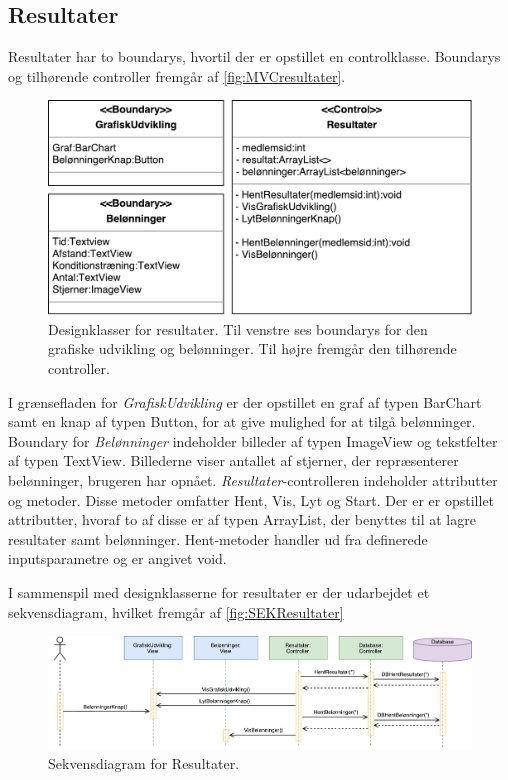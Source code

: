 \subsection*{Resultater}
Resultater har to boundarys, hvortil der er opstillet en controlklasse. Boundarys og tilhørende controller fremgår af \autoref{fig:MVCresultater}. 

\begin{figure} [H]
\centering
\includegraphics[width=1\textwidth]{figures/MVC/MVCResultater}
\caption{Designklasser for resultater. Til venstre ses boundarys for den grafiske udvikling og belønninger. Til højre fremgår den tilhørende controller.}
\label{fig:MVCresultater}
\end{figure}

\noindent
I grænsefladen for \textit{GrafiskUdvikling} er der opstillet en graf af typen BarChart samt en knap af typen Button, for at give mulighed for at tilgå belønninger. Boundary for \textit{Belønninger} indeholder billeder af typen ImageView og tekstfelter af typen TextView. Billederne viser antallet af stjerner, der repræsenterer belønninger, brugeren har opnået.
\textit{Resultater}-controlleren indeholder attributter og metoder. Disse metoder omfatter Hent, Vis, Lyt og Start. Der er er opstillet attributter, hvoraf to af disse er af typen ArrayList, der benyttes til at lagre resultater samt belønninger. Hent-metoder handler ud fra definerede inputsparametre og er angivet void. 

I sammenspil med designklasserne for resultater er der udarbejdet et sekvensdiagram, hvilket fremgår af \autoref{fig:SEKResultater}

\begin{figure} [H]
\centering
\includegraphics[width=1\textwidth]{figures/Sek/SEKResultater}
\caption{Sekvensdiagram for Resultater.}
\label{fig:SEKResultater}
\end{figure} 

